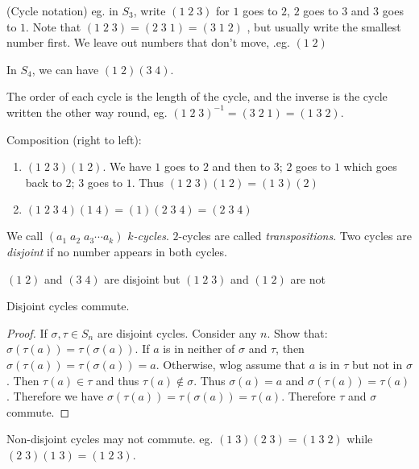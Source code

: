 \documentclass[a4paper]{article}
\begin{document}
  \begin{notation}
    (Cycle notation) eg. in $S_3$, write $(1\;2\;3)$ for $1$ goes to $2$, $2$ goes to $3$ and $3$ goes to $1$. Note that $(1\; 2\; 3) = (2\; 3\; 1) = (3\; 1\; 2)$ , but usually write the smallest number first. We leave out numbers that don't move, .eg. $(1\; 2)$

    In $S_4$, we can have $(1\; 2)(3\; 4)$.
  \end{notation}
  \note The order of each cycle is the length of the cycle, and the inverse is the cycle written the other way round, eg. $(1\; 2\; 3)^{-1} = (3\; 2\; 1) = (1\; 3\; 2)$.

  \begin{eg}
    Composition (right to left):
    \begin{enumerate}
      \item $(1\; 2\; 3)(1\; 2)$. We have $1$ goes to $2$ and then to $3$; $2$ goes to $1$ which goes back to $2$; $3$ goes to $1$. Thus $(1\; 2\; 3)(1\; 2) = (1\;3)(2)$
      \item $(1\; 2\; 3\; 4)(1\; 4) = (1)(2\; 3\; 4) = (2\; 3\; 4)$
    \end{enumerate}
  \end{eg}
  \begin{defi}
    We call $(a_1\; a_2\; a_3\cdots a_k)$ \emph{$k$-cycles}. $2$-cycles are called \emph{transpositions}. Two cycles are \emph{disjoint} if no number appears in both cycles.
  \end{defi}
  \begin{eg}
    $(1\; 2)$ and $(3\; 4)$ are disjoint but $(1\; 2\; 3)$ and $(1\; 2)$ are not
  \end{eg}
  \begin{lemma}
    Disjoint cycles commute.
  \end{lemma}
  \begin{proof}
    If $\sigma, \tau\in S_n$ are disjoint cycles. Consider any $n$. Show that: $\sigma(\tau(a)) = \tau(\sigma(a))$. If $a$ is in neither of $\sigma$ and $\tau$, then $\sigma(\tau(a)) = \tau(\sigma(a)) = a$. Otherwise, wlog assume that $a$ is in $\tau$ but not in $\sigma$. Then $\tau(a)\in \tau$ and thus $\tau(a)\not\in \sigma$. Thus $\sigma(a) = a$ and $\sigma(\tau(a)) = \tau(a)$. Therefore we have $\sigma(\tau(a)) = \tau(\sigma(a)) = \tau(a)$. Therefore $\tau$ and $\sigma$ commute.
  \end{proof}
  \note Non-disjoint cycles may not commute. eg. $(1\; 3)(2\; 3) = (1\; 3\; 2)$ while $(2\; 3)(1\; 3) = (1\; 2\; 3)$.
\end{document}
